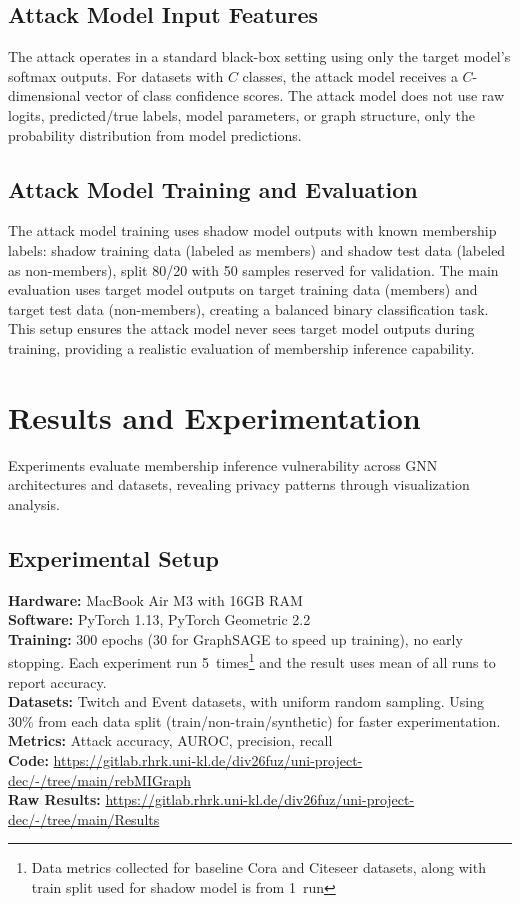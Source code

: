 \documentclass{article}
\begin{document}
\subsection{Attack Model Input Features}
The attack operates in a standard black-box setting using only the target model's softmax outputs. For datasets with $C$ classes, the attack model receives a $C$-dimensional vector of class confidence scores. The attack model does not use raw logits, predicted/true labels, model parameters, or graph structure, only the probability distribution from model predictions.

\subsection{Attack Model Training and Evaluation}
The attack model training uses shadow model outputs with known membership labels: shadow training data (labeled as members) and shadow test data (labeled as non-members), split 80/20 with 50 samples reserved for validation. The main evaluation uses target model outputs on target training data (members) and target test data (non-members), creating a balanced binary classification task. This setup ensures the attack model never sees target model outputs during training, providing a realistic evaluation of membership inference capability.

\section{Results and Experimentation}
\label{results}
Experiments evaluate membership inference vulnerability across GNN architectures and datasets, revealing privacy patterns through visualization analysis.

\subsection{Experimental Setup}
\textbf{Hardware:} MacBook Air M3 with 16GB RAM\\
\textbf{Software:} PyTorch 1.13, PyTorch Geometric 2.2\\
\textbf{Training:} 300 epochs (30 for GraphSAGE to speed up training), no early stopping. Each experiment run 5~times\footnote{Data metrics collected for baseline Cora and Citeseer datasets, along with train split used for shadow model is from 1~run} and the result uses mean of all runs to report accuracy.\\
\textbf{Datasets:} Twitch and Event datasets, with uniform random sampling. Using 30\% from each data split (train/non-train/synthetic) for faster experimentation.\\
\textbf{Metrics:} Attack accuracy, AUROC, precision, recall\\
\textbf{Code:} \url{https://gitlab.rhrk.uni-kl.de/div26fuz/uni-project-dec/-/tree/main/rebMIGraph} \\
\textbf{Raw Results:} \url{https://gitlab.rhrk.uni-kl.de/div26fuz/uni-project-dec/-/tree/main/Results}
\end{document}
